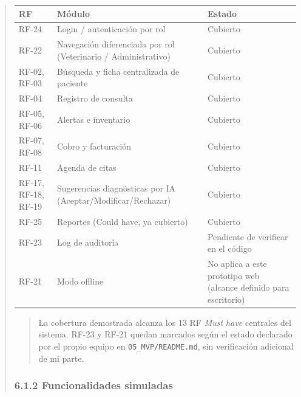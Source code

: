 \documentclass[
]{article}
\newcounter{none} %
\begin{document}
\begin{quote}
{\def\LTcaptype{none} %
\begin{longtable}[]{|
  >{\raggedright\arraybackslash}p{}|
  >{\raggedright\arraybackslash}p{}|
  >{\raggedright\arraybackslash}p{}|}
\hline
\begin{minipage}[b]{\linewidth}\raggedright
\textbf{RF}
\end{minipage} & \begin{minipage}[b]{\linewidth}\raggedright
\textbf{Módulo}
\end{minipage} & \begin{minipage}[b]{\linewidth}\raggedright
\textbf{Estado}
\end{minipage} \\
\hline
\endhead
\hline
\endlastfoot
RF-24 & Login / autenticación por rol & Cubierto \\
\hline
RF-22 & Navegación diferenciada por rol (Veterinario / Administrativo) & Cubierto \\
\hline
RF-02, RF-03 & Búsqueda y ficha centralizada de paciente & Cubierto \\
\hline
RF-04 & Registro de consulta & Cubierto \\
\hline
RF-05, RF-06 & Alertas e inventario & Cubierto \\
\hline
RF-07, RF-08 & Cobro y facturación & Cubierto \\
\hline
RF-11 & Agenda de citas & Cubierto \\
\hline
RF-17, RF-18, RF-19 & Sugerencias diagnósticas por IA (Aceptar/Modificar/Rechazar) & Cubierto \\
\hline
RF-25 & Reportes (Could have, ya cubierto) & Cubierto \\
\hline
RF-23 & Log de auditoría & Pendiente de verificar en el código \\
\hline
RF-21 & Modo offline & No aplica a este prototipo web (alcance definido para escritorio) \\
\hline
\end{longtable}
}

\begin{quote}
La cobertura demostrada alcanza los 13 RF \emph{Must have} centrales del
sistema. RF-23 y RF-21 quedan marcados según el estado declarado por el
propio equipo en \texttt{05\_MVP/README.md}, sin verificación adicional de
mi parte.
\end{quote}

\subsubsection{6.1.2 Funcionalidades simuladas}\label{s6-1-2-funcionalidades-simuladas}


\end{quote}
\end{document}
